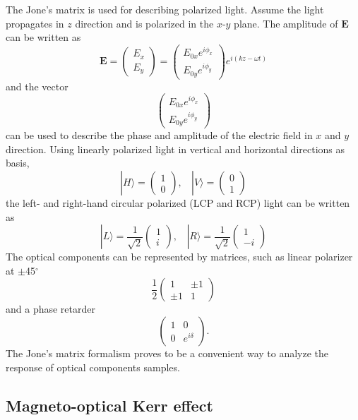 \documentclass[pdflatex, sectionletters, 12pt]{pittetd}    %
\begin{document}
The Jone's matrix is used for describing polarized light. Assume the light propagates in $z$ direction and is polarized in the $x$-$y$ plane. The amplitude of $\mathbf{E}$ can be written as
$$
\mathbf{E} = 
\begin{pmatrix}
E_x \\
E_y
\end{pmatrix}
=
\begin{pmatrix}
E_{0x} e^{i\phi_x} \\
E_{0y} e^{i\phi_y}
\end{pmatrix}
e^{i(kz - \omega t)}
$$
and the vector 
$$
\begin{pmatrix}
E_{0x} e^{i\phi_x} \\
E_{0y} e^{i\phi_y}
\end{pmatrix}
$$
can be used to describe the phase and amplitude of the electric field in $x$ and $y$ direction. Using linearly polarized light in vertical and horizontal directions as basis, 
$$
|H \rangle = 
\begin{pmatrix}
1 \\
0
\end{pmatrix}, \ \ \ \
|V \rangle = 
\begin{pmatrix}
0 \\
1
\end{pmatrix}
$$
the left- and right-hand circular polarized (LCP and RCP) light can be written as
$$
|L \rangle = \frac{1}{\sqrt{2}}
\begin{pmatrix}
1 \\
i
\end{pmatrix}, \ \ \ \
|R \rangle = \frac{1}{\sqrt{2}}
\begin{pmatrix}
1 \\
-i
\end{pmatrix}
$$
The optical components can be represented by matrices, such as linear polarizer at $\pm$45$^{\circ}$
$$
\frac{1}{2}
\begin{pmatrix}
1 & \pm 1 \\
\pm 1 & 1
\end{pmatrix}
$$
and a phase retarder
$$
\begin{pmatrix}
1 & 0 \\
0 & e^{i\delta}
\end{pmatrix}.
$$
The Jone's matrix formalism proves to be a convenient way to analyze the response of optical components samples.

\subsection{Magneto-optical Kerr effect}
\end{document}
